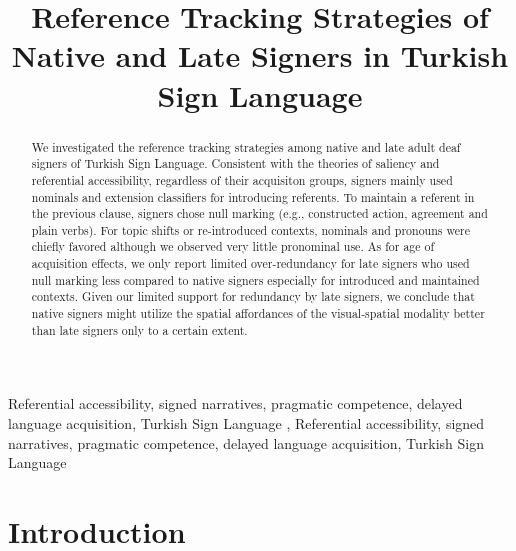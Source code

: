 \documentclass[review]{elsarticle} %
\begin{document}
\begin{frontmatter}

  \title{Reference Tracking Strategies of Native and Late Signers in
Turkish Sign Language}
  
  \begin{abstract}
  We investigated the reference tracking strategies among native and
  late adult deaf signers of Turkish Sign Language. Consistent with the
  theories of saliency and referential accessibility, regardless of
  their acquisiton groups, signers mainly used nominals and extension
  classifiers for introducing referents. To maintain a referent in the
  previous clause, signers chose null marking (e.g., constructed action,
  agreement and plain verbs). For topic shifts or re-introduced
  contexts, nominals and pronouns were chiefly favored although we
  observed very little pronominal use. As for age of acquisition
  effects, we only report limited over-redundancy for late signers who
  used null marking less compared to native signers especially for
  introduced and maintained contexts. Given our limited support for
  redundancy by late signers, we conclude that native signers might
  utilize the spatial affordances of the visual-spatial modality better
  than late signers only to a certain extent.
  \end{abstract}
    \begin{keyword}
    Referential accessibility, signed narratives, pragmatic competence,
delayed language acquisition, Turkish Sign Language \sep 
    Referential accessibility, signed narratives, pragmatic competence,
delayed language acquisition, Turkish Sign Language
  \end{keyword}
  
 \end{frontmatter}

\hypertarget{introduction}{%
\section{Introduction}\label{introduction}}
\end{document}

